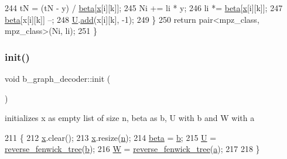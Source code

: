 \begin{DoxyCode}
244     tN = (tN - y) / \hyperlink{classb__graph__decoder_a3e5babfb07af486c1d9e991f65251266}{beta}[\hyperlink{classb__graph__decoder_a6bba2e67984f9733fc60c40dd4956587}{x}[i][k]];
245     Ni += li * y;
246     li *= \hyperlink{classb__graph__decoder_a3e5babfb07af486c1d9e991f65251266}{beta}[\hyperlink{classb__graph__decoder_a6bba2e67984f9733fc60c40dd4956587}{x}[i][k]];
247     \hyperlink{classb__graph__decoder_a3e5babfb07af486c1d9e991f65251266}{beta}[x[i][k]] --;
248     \hyperlink{classb__graph__decoder_ae15e74088bb60a096562a9bdaf380f2c}{U}.\hyperlink{classreverse__fenwick__tree_a942d7f49b37e53ebfec3076d177691d7}{add}(x[i][k], -1);
249   \}
250   \textcolor{keywordflow}{return} pair<mpz\_class, mpz\_class>(Ni, li);
251 \}
\end{DoxyCode}
\mbox{\label{classb__graph__decoder_a9498e8aa7391480cc663bffef3718c6b}} 
\subsubsection{\texorpdfstring{init()}{init()}}
{\footnotesize\ttfamily void b\+\_\+graph\+\_\+decoder\+::init (\begin{DoxyParamCaption}{ }\end{DoxyParamCaption})}



initializes x as empty list of size n, beta as b, U with b and W with a 


\begin{DoxyCode}
211 \{
212   \hyperlink{classb__graph__decoder_a6bba2e67984f9733fc60c40dd4956587}{x}.clear();
213   \hyperlink{classb__graph__decoder_a6bba2e67984f9733fc60c40dd4956587}{x}.resize(\hyperlink{classb__graph__decoder_a2caddd63df6808c95e2ee738f7c77870}{n});
214   \hyperlink{classb__graph__decoder_a3e5babfb07af486c1d9e991f65251266}{beta} = \hyperlink{classb__graph__decoder_a12d1a4a91f342111d2116196cb826317}{b};
215   \hyperlink{classb__graph__decoder_ae15e74088bb60a096562a9bdaf380f2c}{U} = \hyperlink{classreverse__fenwick__tree}{reverse\_fenwick\_tree}(\hyperlink{classb__graph__decoder_a12d1a4a91f342111d2116196cb826317}{b});
216   \hyperlink{classb__graph__decoder_a2c3f91db1f54ddfd411f74d18b01b606}{W} = \hyperlink{classreverse__fenwick__tree}{reverse\_fenwick\_tree}(\hyperlink{classb__graph__decoder_afcf783e4199fb8f9d6828db08bb12333}{a});
217   
218 \}
\end{DoxyCode}



